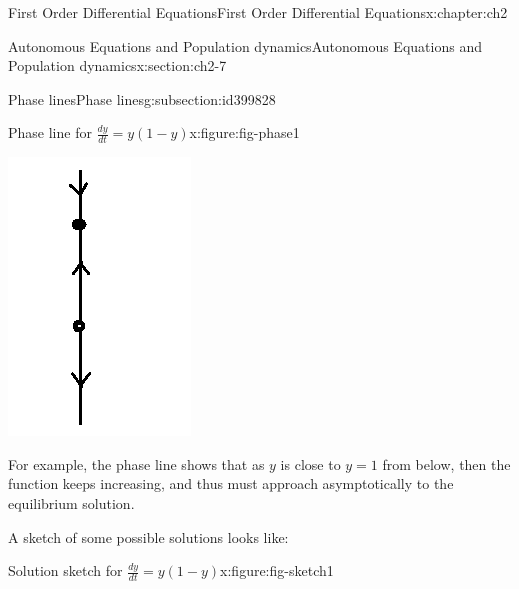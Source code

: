 \documentclass[oneside,10pt,]{book}
\numberwithin{equation}{section}
\numberwithin{equation}{section}
\begin{document}
\begin{chapterptx}{First Order Differential Equations}{}{First Order Differential Equations}{}{}{x:chapter:ch2}
\begin{sectionptx}{Autonomous Equations and Population dynamics}{}{Autonomous Equations and Population dynamics}{}{}{x:section:ch2-7}
\begin{subsectionptx}{Phase lines}{}{Phase lines}{}{}{g:subsection:id399828}
\begin{figureptx}{Phase line for \(\frac{dy}{dt} = y(1-y)\)}{x:figure:fig-phase1}{}
\begin{image}{0.35}{0.3}{0.35}
\includegraphics[width=\linewidth]{images/1.6-Phase1.png}
\end{image}%
\tcblower
\end{figureptx}%
For example, the phase line shows that as \(y\) is close to \(y=1\) from below, then the function keeps increasing, and thus must approach asymptotically to the equilibrium solution.%
\par
A sketch of some possible solutions looks like: \begin{figureptx}{Solution sketch for \(\frac{dy}{dt} = y(1-y)\)}{x:figure:fig-sketch1}{}%
\begin{image}{0.3}{0.4}{0.3}%

\end{image}
\end{figureptx}
\end{subsectionptx}
\end{sectionptx}
\end{chapterptx}
\end{document}
